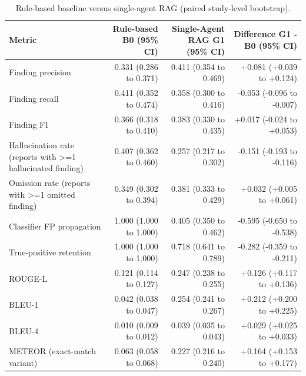 \begin{table}[t]
\centering
\scriptsize
\begin{tabular}{lrrr}
\hline
Metric & Rule-based B0 (95\% CI) & Single-Agent RAG G1 (95\% CI) & Difference G1 - B0 (95\% CI) \\
\hline
Finding precision & 0.331 (0.286 to 0.371) & 0.411 (0.354 to 0.469) & +0.081 (+0.039 to +0.124) \\
Finding recall & 0.411 (0.352 to 0.474) & 0.358 (0.300 to 0.416) & -0.053 (-0.096 to -0.007) \\
Finding F1 & 0.366 (0.318 to 0.410) & 0.383 (0.330 to 0.435) & +0.017 (-0.024 to +0.053) \\
Hallucination rate (reports with >=1 hallucinated finding) & 0.407 (0.362 to 0.460) & 0.257 (0.217 to 0.302) & -0.151 (-0.193 to -0.116) \\
Omission rate (reports with >=1 omitted finding) & 0.349 (0.302 to 0.394) & 0.381 (0.333 to 0.429) & +0.032 (+0.005 to +0.061) \\
Classifier FP propagation & 1.000 (1.000 to 1.000) & 0.405 (0.350 to 0.462) & -0.595 (-0.650 to -0.538) \\
True-positive retention & 1.000 (1.000 to 1.000) & 0.718 (0.641 to 0.789) & -0.282 (-0.359 to -0.211) \\
ROUGE-L & 0.121 (0.114 to 0.127) & 0.247 (0.238 to 0.255) & +0.126 (+0.117 to +0.136) \\
BLEU-1 & 0.042 (0.038 to 0.047) & 0.254 (0.241 to 0.267) & +0.212 (+0.200 to +0.225) \\
BLEU-4 & 0.010 (0.009 to 0.012) & 0.039 (0.035 to 0.043) & +0.029 (+0.025 to +0.033) \\
METEOR (exact-match variant) & 0.063 (0.058 to 0.068) & 0.227 (0.216 to 0.240) & +0.164 (+0.153 to +0.177) \\
\hline
\end{tabular}
\caption{Rule-based baseline versus single-agent RAG (paired study-level bootstrap).}
\label{tab:table2_b0_vs_g1_main_metrics}
\end{table}
